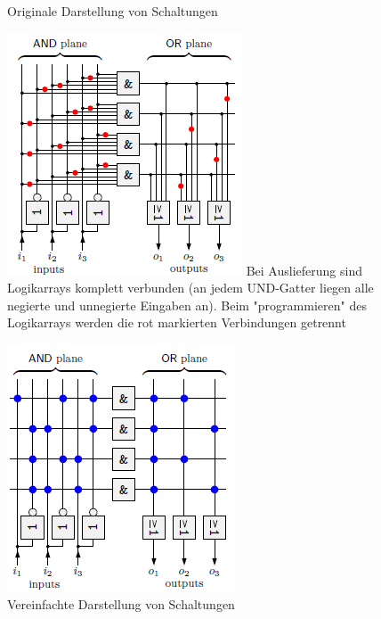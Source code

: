 \documentclass[12pt]{report}
\begin{document}
\begin{figure}[h]
  \begin{minipage}[t]{0.45\textwidth}
    \caption{Originale Darstellung von Schaltungen}
    \includegraphics[height=\textwidth]{graphics/PLA_implementation.png}
    Bei Auslieferung sind Logikarrays komplett verbunden (an jedem UND-Gatter liegen alle negierte und unnegierte Eingaben an).
    Beim "programmieren" des Logikarrays werden die rot markierten Verbindungen getrennt
  \end{minipage}
  \hfill
  \begin{minipage}[t]{0.45\textwidth}
    \caption{Vereinfachte Darstellung von Schaltungen}
    \includegraphics[height=\textwidth]{graphics/PLA_implementation_simplification.png}

\end{minipage}
\end{figure}
\end{document}
